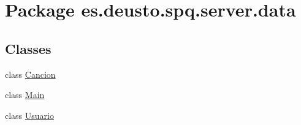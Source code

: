 \hypertarget{namespacees_1_1deusto_1_1spq_1_1server_1_1data}{}\section{Package es.\+deusto.\+spq.\+server.\+data}
\label{namespacees_1_1deusto_1_1spq_1_1server_1_1data}
\subsection*{Classes}
\begin{DoxyCompactItemize}
\item 
class \hyperlink{classes_1_1deusto_1_1spq_1_1server_1_1data_1_1_cancion}{Cancion}
\item 
class \hyperlink{classes_1_1deusto_1_1spq_1_1server_1_1data_1_1_main}{Main}
\item 
class \hyperlink{classes_1_1deusto_1_1spq_1_1server_1_1data_1_1_usuario}{Usuario}
\end{DoxyCompactItemize}

